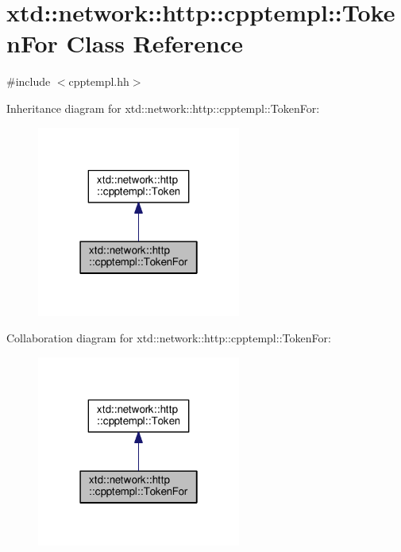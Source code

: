 \hypertarget{classxtd_1_1network_1_1http_1_1cpptempl_1_1TokenFor}{}\section{xtd\+:\+:network\+:\+:http\+:\+:cpptempl\+:\+:Token\+For Class Reference}
\label{classxtd_1_1network_1_1http_1_1cpptempl_1_1TokenFor}


{\ttfamily \#include $<$cpptempl.\+hh$>$}



Inheritance diagram for xtd\+:\+:network\+:\+:http\+:\+:cpptempl\+:\+:Token\+For\+:
\nopagebreak
\begin{figure}[H]
\begin{center}
\leavevmode
\includegraphics[width=190pt]{classxtd_1_1network_1_1http_1_1cpptempl_1_1TokenFor__inherit__graph}
\end{center}
\end{figure}


Collaboration diagram for xtd\+:\+:network\+:\+:http\+:\+:cpptempl\+:\+:Token\+For\+:
\nopagebreak
\begin{figure}[H]
\begin{center}
\leavevmode
\includegraphics[width=190pt]{classxtd_1_1network_1_1http_1_1cpptempl_1_1TokenFor__coll__graph}
\end{center}
\end{figure}
